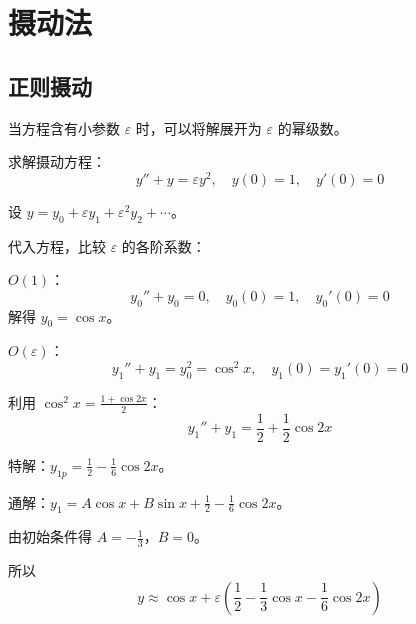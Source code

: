 \section{摄动法}

\subsection{正则摄动}

当方程含有小参数 $\varepsilon$ 时，可以将解展开为 $\varepsilon$ 的幂级数。

\begin{lizi}{}{}
求解摄动方程：
\begin{equation}
    y'' + y = \varepsilon y^2, \quad y(0) = 1, \quad y'(0) = 0
\end{equation}

\begin{jie}
    设 $y = y_0 + \varepsilon y_1 + \varepsilon^2 y_2 + \cdots$。
    
    代入方程，比较 $\varepsilon$ 的各阶系数：
    
    $O(1)$：
    \begin{equation}
        y_0'' + y_0 = 0, \quad y_0(0) = 1, \quad y_0'(0) = 0
    \end{equation}
    解得 $y_0 = \cos x$。
    
    $O(\varepsilon)$：
    \begin{equation}
        y_1'' + y_1 = y_0^2 = \cos^2 x, \quad y_1(0) = y_1'(0) = 0
    \end{equation}
    
    利用 $\cos^2 x = \frac{1 + \cos 2x}{2}$：
    \begin{equation}
        y_1'' + y_1 = \frac{1}{2} + \frac{1}{2}\cos 2x
    \end{equation}
    
    特解：$y_{1p} = \frac{1}{2} - \frac{1}{6}\cos 2x$。
    
    通解：$y_1 = A\cos x + B\sin x + \frac{1}{2} - \frac{1}{6}\cos 2x$。
    
    由初始条件得 $A = -\frac{1}{3}$，$B = 0$。
    
    所以
    \begin{equation}
        y \approx \cos x + \varepsilon\left(\frac{1}{2} - \frac{1}{3}\cos x - \frac{1}{6}\cos 2x\right)
    \end{equation}
\end{jie}
\end{lizi}

